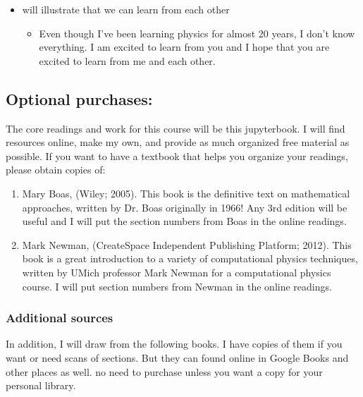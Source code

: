 \documentclass[letterpaper,10pt,english]{jupyterBook}
\begin{document}
\begin{itemize}
\begin{itemize}
\end{itemize}

\item {} 
 will illustrate that we can learn from each other
\begin{itemize}
\item {} 
\sphinxAtStartPar
Even though I’ve been learning physics for almost 20 years, I don’t know everything. I am excited to learn from you and I hope that you are excited to learn from me and each other.

\end{itemize}

\end{itemize}


\subsection{Optional purchases:}
\label{\detokenize{content/0_course/design:optional-purchases}}
\sphinxAtStartPar
The core readings and work for this course will be this jupyterbook. I will find resources online, make my own, and provide as much organized free material as possible. If you want to have a textbook that helps you organize your readings, please obtain copies of:
\begin{enumerate}
%
\item {} 
\sphinxAtStartPar
Mary Boas,  (Wiley; 2005). This book is the definitive text on mathematical approaches, written by Dr. Boas originally in 1966! Any 3rd edition will be useful and I will put the section numbers from Boas in the online readings.

\item {} 
\sphinxAtStartPar
Mark Newman,  (CreateSpace Independent Publishing Platform; 2012). This book is a great introduction to a variety of computational physics techniques, written by UMich professor Mark Newman for a computational physics course. I will put section numbers from Newman in the online readings.

\end{enumerate}


\subsubsection{Additional sources}
\label{\detokenize{content/0_course/design:additional-sources}}
\sphinxAtStartPar
In addition, I will draw from the following books. I have copies of them if you want or need scans of sections. But they can found online in Google Books and other places as well. no need to purchase unless you want a copy for your personal library.
\end{document}
